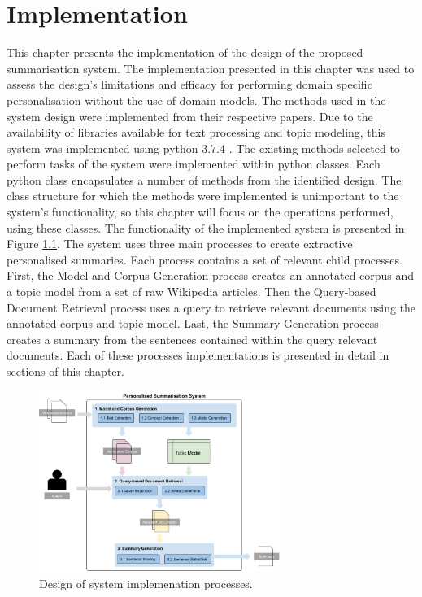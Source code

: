 \chapter{Implementation}
This chapter presents the implementation of the design of the proposed summarisation system. The implementation presented in this chapter was used to assess the design’s limitations and efficacy for performing domain specific personalisation without the use of domain models. The methods used in the system design were implemented from their respective papers. Due to the availability of libraries available for text processing and topic modeling, this system was implemented using python 3.7.4 \citep{van2009python}. The existing methods selected to perform tasks of the system were implemented within python classes. Each python class encapsulates a number of methods from the identified design. The class structure for which the methods were implemented is unimportant to the system’s functionality, so this chapter will focus on the operations performed, using these classes. The functionality of the implemented system is presented in Figure \ref{designI}. The system uses three main processes to create extractive personalised summaries. Each process contains a set of relevant child processes. First, the Model and Corpus Generation process creates an annotated corpus and a topic model from a set of raw Wikipedia articles. Then the Query-based Document Retrieval process uses a query to retrieve relevant documents using the annotated corpus and topic model. Last, the Summary Generation process creates a summary from the sentences contained within the query relevant documents. Each of these processes implementations is presented in detail in sections of this chapter. 

\begin{figure}[h]
    \centering
         \includegraphics[width=0.70\textwidth]{Figures/System_Design_Overview.jpg}
          \caption{Design of system implemenation processes.}
           \label{designI}
\end{figure}

